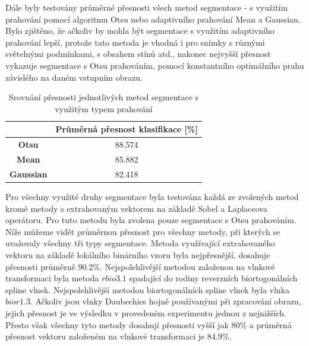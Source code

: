 Dále byly testovány průměrné přesnosti všech metod segmentace - s využitím prahování pomocí algoritmu Otsu nebo adaptivního prahování Mean a Gaussian. Bylo zjištěno, že ačkoliv by mohla být segmentace s využitím adaptivního prahování lepší, protože tato metoda je vhodná i pro snímky s různými světelnými podmínkami, s obsahem stínů atd., nakonec nejvyšší přesnost vykazuje segmentace s Otsu prahováním, pomocí konstantního optimálního prahu závislého na daném vstupním obrazu.

\capstartfalse
\begin{table}[!htbp]
\centering
\begin{tabular}{|c|c|}
\hline
                  & \textbf{Průměrná přesnost klasifikace {[}\%{]}} \\ \hline
\textbf{Otsu}     & 88.574                                         \\ \hline
\textbf{Mean}     & 85.882                                         \\ \hline
\textbf{Gaussian} & 82.418                                         \\ \hline
\end{tabular}
\caption{Srovnání přesnosti jednotlivých metod segmentace s využitým typem prahování}
\end{table}
\capstarttrue

 Pro všechny využité druhy segmentace byla testována každá ze zvolených metod kromě metody s extrahovaným vektorem na základě Sobel a Laplaceova operátoru. Pro tuto metodu byla zvolena pouze segmentace s Otsu prahováním. Níže můžeme vidět průměrnou přesnost pro všechny metody, při kterých se uvažovaly všechny tři typy segmentace. Metoda využívající extrahovaného vektoru na základě lokálního binárního vzoru byla nejpřesnější, dosahuje přesnosti průměrně 90.2\%. Nejspolehlivější metodou založenou na vlnkové transformaci byla metoda $rbio3.1$ spadající do rodiny reverzních biortogonálních spline vlnek. Nejspolehlivější metodou biortogonálních spline vlnek byla vlnka $bior1.3$. Ačkoliv jsou vlnky Daubechies hojně používanými při zpracování obrazu, jejich přesnost je ve výsledku v provedeném experimentu jednou z nejnižších. Přesto však všechny tyto metody dosahují přesnosti vyšší jak 80\% a průměrná přesnost vektoru založeném na vlnkové transformaci je 84.9\%.
 

